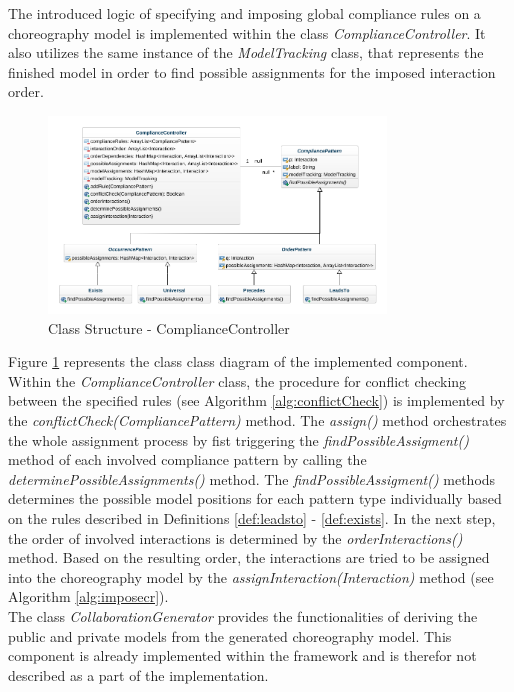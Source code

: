 The introduced logic of specifying and imposing global compliance rules on a choreography model is implemented within the class \textit{ComplianceController}. It also utilizes the same instance of the \textit{ModelTracking} class, that represents the finished model in order to find possible assignments for the imposed interaction order.\\

\begin{figure}[H]
\centering
\includegraphics[width=0.8\textwidth]{src/images/compliancecontroller_class.png}
\caption{Class Structure - ComplianceController}
\label{fig:impl_compcon_overview}
\end{figure}

Figure \ref{fig:impl_compcon_overview} represents the class class diagram of the implemented component. Within the \textit{ComplianceController} class, the procedure for conflict checking between the specified rules (see Algorithm \ref{alg:conflictCheck}) is implemented by the \textit{conflictCheck(CompliancePattern)} method. The \textit{assign()} method orchestrates the whole assignment process by fist triggering the \textit{findPossibleAssigment()} method of each involved compliance pattern by calling the \textit{determinePossibleAssignments()} method. The \textit{findPossibleAssigment()} methods determines the possible model positions for each pattern type individually based on the rules described in Definitions \ref{def:leadsto} - \ref{def:exists}. In the next step, the order of involved interactions is determined by the \textit{orderInteractions()} method. Based on the resulting order, the interactions are tried to be assigned into the choreography model by the \textit{assignInteraction(Interaction)} method (see Algorithm \ref{alg:imposecr}).\\

The class \textit{CollaborationGenerator} provides the functionalities of deriving the public and private models from the generated choreography model. This component is already implemented within the framework and is therefor not described as a part of the implementation.\\

